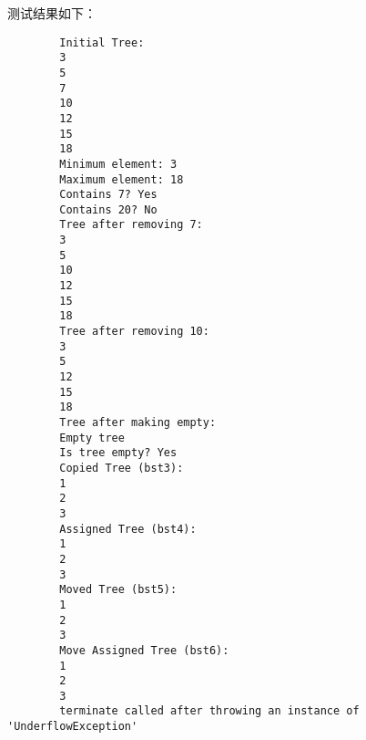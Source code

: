 \documentclass[UTF8]{ctexart}
\begin{document}
测试结果如下：

\begin{verbatim}
        Initial Tree:
        3
        5
        7
        10
        12
        15
        18
        Minimum element: 3
        Maximum element: 18
        Contains 7? Yes
        Contains 20? No
        Tree after removing 7:
        3
        5
        10
        12
        15
        18
        Tree after removing 10:
        3
        5
        12
        15
        18
        Tree after making empty:
        Empty tree
        Is tree empty? Yes
        Copied Tree (bst3):
        1
        2
        3
        Assigned Tree (bst4):
        1
        2
        3
        Moved Tree (bst5):
        1
        2
        3
        Move Assigned Tree (bst6):
        1
        2
        3
        terminate called after throwing an instance of 'UnderflowException'
\end{verbatim}
\end{document}

